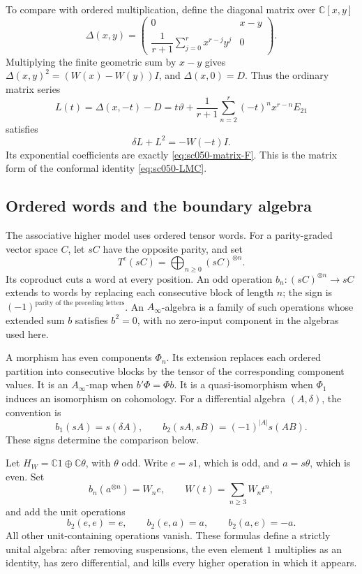 To compare with ordered multiplication, define the diagonal
matrix over \(\mathbb C[x,y]\)
\[
 \Delta(x,y)=
 \begin{pmatrix}
 0&x-y\\
 \dfrac1{r+1}\displaystyle\sum_{j=0}^r x^{r-j}y^j&0
 \end{pmatrix}.
\]
Multiplying the finite geometric sum by \(x-y\) gives
\(\Delta(x,y)^2=(W(x)-W(y))I\), and \(\Delta(x,0)=D\).
Thus the ordinary matrix series
\[
 L(t)=\Delta(x,-t)-D
     =t\vartheta+\frac1{r+1}
                         \sum_{n=2}^r(-t)^n x^{r-n}E_{21}
\]
satisfies
\begin{equation}\label{eq:sc050-Lmatrix}
 \delta L+L^2=-W(-t)I.
\end{equation}
Its exponential coefficients are exactly
\eqref{eq:sc050-matrix-F}. This is the matrix form of the
conformal identity \eqref{eq:sc050-LMC}.

\subsection{Ordered words and the boundary algebra}

The associative higher model uses ordered tensor words. For a
parity-graded vector space \(C\), let \(sC\) have the opposite
parity, and set
\[
 T^c(sC)=\bigoplus_{n\ge0}(sC)^{\otimes n}.
\]
Its coproduct cuts a word at every position. An odd operation
\(b_n:(sC)^{\otimes n}\to sC\) extends to words by replacing
each consecutive block of length \(n\); the sign is
\((-1)^{\text{parity of the preceding letters}}\).
An \(A_\infty\)-algebra is a family of such operations whose
extended sum \(b\) satisfies \(b^2=0\), with no zero-input
component in the algebras used here.

A morphism has even components \(\Phi_n\). Its extension replaces
each ordered partition into consecutive blocks by the tensor of
the corresponding component values. It is an \(A_\infty\)-map
when \(b'\Phi=\Phi b\). It is a quasi-isomorphism when \(\Phi_1\)
induces an isomorphism on cohomology. For a differential algebra
\((A,\delta)\), the convention is
\begin{equation}\label{eq:sc050-suspension}
 b_1(sA)=s(\delta A),\qquad
 b_2(sA,sB)=(-1)^{|A|}s(AB).
\end{equation}
These signs determine the comparison below.

Let \(H_W=\mathbb C1\oplus\mathbb C\theta\), with \(\theta\) odd.
Write \(e=s1\), which is odd, and \(a=s\theta\), which is even.
Set
\begin{equation}\label{eq:sc050-boundary}
 b_n(a^{\otimes n})=W_n e,\qquad
 W(t)=\sum_{n\ge3}W_nt^n,
\end{equation}
and add the unit operations
\[
 b_2(e,e)=e,\qquad b_2(e,a)=a,\qquad b_2(a,e)=-a.
\]
All other unit-containing operations vanish. These formulas
define a strictly unital algebra: after removing suspensions,
the even element \(1\) multiplies as an identity, has zero
differential, and kills every higher operation in which it
appears.

